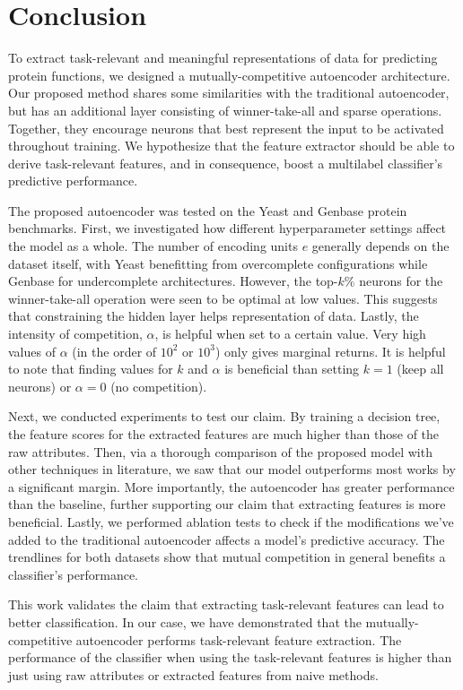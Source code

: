 \section{Conclusion}
\label{MCConclusions}

\par To extract task-relevant and meaningful representations of data for
predicting protein functions, we designed a mutually-competitive autoencoder
architecture.  Our proposed method shares some similarities with the
traditional autoencoder, but has an additional layer consisting of
winner-take-all and sparse operations. Together, they encourage neurons that
best represent the input to be activated throughout training. We hypothesize
that the feature extractor should be able to derive task-relevant features, and
in consequence, boost a multilabel classifier's predictive performance.

\par The proposed autoencoder was tested on the Yeast and Genbase protein
benchmarks. First, we investigated how different hyperparameter settings
affect the model as a whole. The number of encoding units $e$ generally
depends on the dataset itself, with Yeast benefitting from overcomplete
configurations while Genbase for undercomplete architectures. However, the
top-$k\%$ neurons for the winner-take-all operation were seen to be optimal
at low values. This suggests that constraining the hidden layer helps
representation of data. Lastly, the intensity of competition, $\alpha$, is
helpful when set to a certain value. Very high values of $\alpha$ (in the
order of $10^{2}$ or $10^{3}$) only gives marginal returns. It is helpful to
note that finding values for $k$ and $\alpha$ is beneficial than setting
$k=1$ (keep all neurons) or $\alpha=0$ (no competition).

\par Next, we conducted experiments to test our claim. By training a decision
tree, the feature scores for the extracted features are much higher than
those of the raw attributes. Then, via a thorough comparison of the proposed
model with other techniques in literature, we saw that our model outperforms
most works by a significant margin. More importantly, the autoencoder has
greater performance than the baseline, further supporting our claim that
extracting features is more beneficial. Lastly, we performed ablation tests
to check if the modifications we've added to the traditional autoencoder
affects a model's predictive accuracy. The trendlines for both datasets show
that mutual competition in general benefits a classifier's performance.

\par This work validates the claim that extracting task-relevant features can
lead to better classification. In our case, we have demonstrated that the
mutually-competitive autoencoder performs task-relevant feature extraction.
The performance of the classifier when using the task-relevant features is
higher than just using raw attributes or extracted features from naive
methods.
